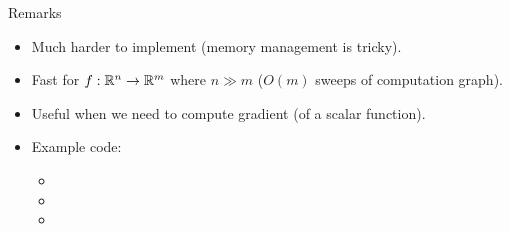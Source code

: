 \begin{frame}{Remarks}
\begin{itemize}
    \item Much harder to implement (memory management is tricky).
    \item Fast for $f:\mathbb{R}^n \to \mathbb{R}^m$ where $n \gg m$ ($O(m)$ sweeps of computation graph).
    \item Useful when we need to compute gradient (of a scalar function).
    \item Example code:
    \begin{itemize}
        \item {}
        \item {}
        \item {}
    \end{itemize}
\end{itemize} 
\end{frame}
